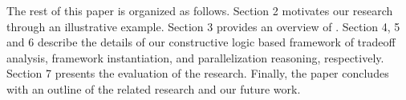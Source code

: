 \documentclass{sig-alternate}
\begin{document}
\sloppy

The rest of this paper is organized as follows. 
Section 2 motivates our research through an illustrative example.
Section 3 provides an overview of \@approach.
Section 4, 5 and 6 describe the details of our constructive logic based framework of tradeoff analysis, framework instantiation, and parallelization reasoning, respectively.   
Section 7 presents the evaluation of the research. Finally, the paper concludes with an outline of the related research and our future work.

\end{document}
